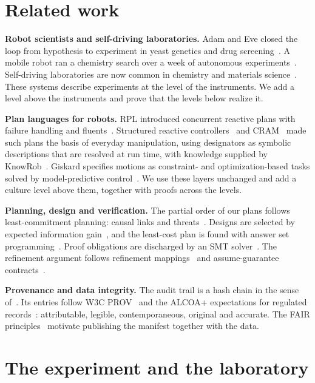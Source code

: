 \documentclass[10pt,a4paper]{article}
\begin{document}
\section{Related work}\label{sec:related}

\textbf{Robot scientists and self-driving laboratories.} Adam and Eve closed the loop from hypothesis to experiment in yeast genetics and drug screening~\citep{king2009,williams2015}. A mobile robot ran a chemistry search over a week of autonomous experiments~\citep{burger2020}. Self-driving laboratories are now common in chemistry and materials science~\citep{abolhasani2023}. These systems describe experiments at the level of the instruments. We add a level above the instruments and prove that the levels below realize it.

\textbf{Plan languages for robots.} RPL introduced concurrent reactive plans with failure handling and fluents~\citep{mcdermott1991}. Structured reactive controllers~\citep{beetz2001} and CRAM~\citep{beetz2010} made such plans the basis of everyday manipulation, using designators as symbolic descriptions that are resolved at run time, with knowledge supplied by KnowRob~\citep{tenorth2013}. Giskard specifies motions as constraint- and optimization-based tasks solved by model-predictive control~\citep{stelter2022}. We use these layers unchanged and add a culture level above them, together with proofs across the levels.

\textbf{Planning, design and verification.} The partial order of our plans follows least-commitment planning: causal links and threats~\citep{weld1994}. Designs are selected by expected information gain~\citep{lindley1956,chaloner1995}, and the least-cost plan is found with answer set programming~\citep{gebser2019}. Proof obligations are discharged by an SMT solver~\citep{demoura2008}. The refinement argument follows refinement mappings~\citep{abadi1991} and assume-guarantee contracts~\citep{benveniste2018}.

\textbf{Provenance and data integrity.} The audit trail is a hash chain in the sense of~\citep{haber1991}. Its entries follow W3C PROV~\citep{prov2013} and the ALCOA+ expectations for regulated records~\citep{fda2018}: attributable, legible, contemporaneous, original and accurate. The FAIR principles~\citep{wilkinson2016} motivate publishing the manifest together with the data.

\section{The experiment and the laboratory}\label{sec:setting}
\end{document}
